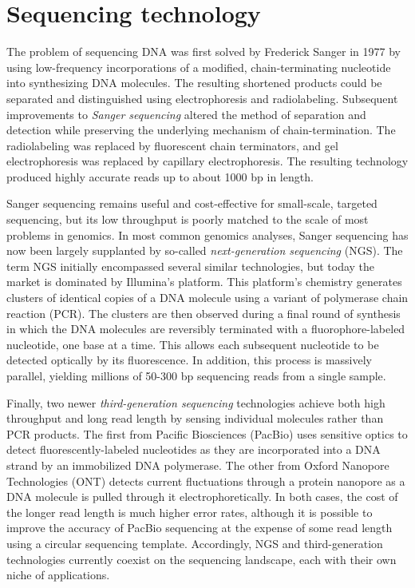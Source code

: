 \documentclass[11pt]{ucthesis}
\begin{document}
\section{Sequencing technology}

The problem of sequencing DNA was first solved by Frederick Sanger in 1977 by using low-frequency incorporations of a modified, chain-terminating nucleotide into synthesizing DNA molecules\cite{sanger1977dna}. The resulting shortened products could be separated and distinguished using electrophoresis and radiolabeling. Subsequent improvements to \emph{Sanger sequencing} altered the method of separation and detection while preserving the underlying mechanism of chain-termination. The radiolabeling was replaced by fluorescent chain terminators, and gel electrophoresis was replaced by capillary electrophoresis\cite{smith1986fluorescence}. The resulting technology produced highly accurate reads up to about 1000 bp in length. 
 
Sanger sequencing remains useful and cost-effective for small-scale, targeted sequencing, but its low throughput is poorly matched to the scale of most problems in genomics. In most common genomics analyses, Sanger sequencing has now been largely supplanted by so-called \emph{next-generation sequencing} (NGS)\cite{metzker2010sequencing}. The term NGS initially encompassed several similar technologies, but today the market is dominated by Illumina's platform. This platform's chemistry generates clusters of identical copies of a DNA molecule using a variant of polymerase chain reaction (PCR). The clusters are then observed during a final round of synthesis in which the DNA molecules are reversibly terminated with a fluorophore-labeled nucleotide, one base at a time. This allows each subsequent nucleotide to be detected optically by its fluorescence. In addition, this process is massively parallel, yielding millions of 50-300 bp sequencing reads from a single sample. 

Finally, two newer \emph{third-generation sequencing} technologies achieve both high throughput and long read length by sensing individual molecules rather than PCR products. The first from Pacific Biosciences (PacBio) uses sensitive optics to detect fluorescently-labeled nucleotides as they are incorporated into a DNA strand by an immobilized DNA polymerase\cite{eid2009real}. The other from Oxford Nanopore Technologies (ONT) detects current fluctuations through a protein nanopore as a DNA molecule is pulled through it electrophoretically\cite{mikheyev2014first}. In both cases, the cost of the longer read length is much higher error rates, although it is possible to improve the accuracy of PacBio sequencing at the expense of some read length using a circular sequencing template\cite{wenger2019accurate}. Accordingly, NGS and third-generation technologies currently coexist on the sequencing landscape, each with their own niche of applications.
 
\end{document}
